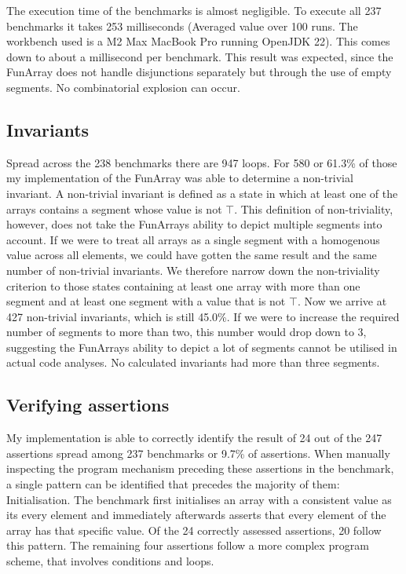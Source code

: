 \documentclass{report}
\begin{document}
The execution time of the benchmarks is almost negligible. To execute all 237 benchmarks it takes 253 milliseconds (Averaged value over 100 runs. The workbench used is a M2 Max MacBook Pro running OpenJDK 22). This comes down to about a millisecond per benchmark. This result was expected, since the FunArray does not handle disjunctions separately but through the use of empty segments. No combinatorial explosion can occur.

\subsection{Invariants}
Spread across the 238 benchmarks there are 947 loops. For 580 or 61.3\% of those my implementation of the FunArray was able to determine a non-trivial invariant. A non-trivial invariant is defined as a state in which at least one of the arrays contains a segment whose value is not $\top$.
This definition of non-triviality, however, does not take the FunArrays ability to depict multiple segments into account. If we were to treat all arrays as a single segment with a homogenous value across all elements, we could have gotten the same result and the same number of non-trivial invariants. We therefore narrow down the non-triviality criterion to those states containing at least one array with more than one segment and at least one segment with a value that is not $\top$. Now we arrive at 427 non-trivial invariants, which is still 45.0\%. 
If we were to increase the required number of segments to more than two, this number would drop down to 3, suggesting the FunArrays ability to depict a lot of segments cannot be utilised in actual code analyses. No calculated invariants had more than three segments.

\subsection{Verifying assertions}

My implementation is able to correctly identify the result of 24 out of the 247 assertions spread among 237 benchmarks or 9.7\% of assertions. When manually inspecting the program mechanism preceding these assertions in the benchmark, a single pattern can be identified that precedes the majority of them: Initialisation. The benchmark first initialises an array with a consistent value as its every element and immediately afterwards asserts that every element of the array has that specific value. Of the 24 correctly assessed assertions, 20 follow this pattern. The remaining four assertions follow a more complex program scheme, that involves conditions and loops.
\end{document}

